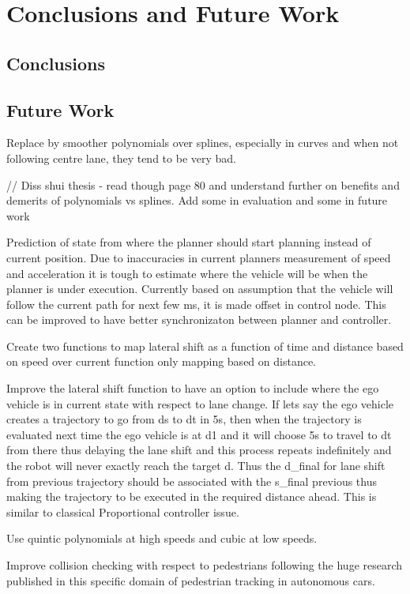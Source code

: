 \chapter{Conclusions and Future Work}
\label{conclusion}
\section{Conclusions}

\section{Future Work}
Replace by smoother polynomials over splines, especially in curves and when not following centre lane, they tend to be very bad. 

// Diss shui thesis - read though page 80 and understand further on benefits and demerits of polynomials vs splines. Add some in evaluation and some in future work


Prediction of state from where the planner should start planning instead of current position. 
Due to inaccuracies in current planners measurement of speed and acceleration it is tough to estimate where the vehicle will be when the planner is under execution. Currently based on assumption that the vehicle will follow the current path for next few ms, it is made offset in control node. This can be improved to have better synchronizaton between planner and controller. 


Create two functions to map lateral shift as a function of time and distance based on speed over current function only mapping based on distance.  

Improve the lateral shift function to have an option to include where the ego vehicle is in current state with respect to lane change. If lets say the ego vehicle creates a trajectory to go from ds to dt in 5s, then when the trajectory is evaluated next time the ego vehicle is at d1 and it will choose 5s to travel to dt from there thus delaying the lane shift and this process repeats indefinitely and the robot will never exactly reach the target d. Thus the d\_final for lane shift from previous trajectory should be associated with the s\_final previous thus making the trajectory to be executed in the required distance ahead. This is similar to classical Proportional controller issue.  

Use quintic polynomials at high speeds and cubic at low speeds. 

Improve collision checking with respect to pedestrians following the huge research published in this specific domain of pedestrian tracking in autonomous cars. 